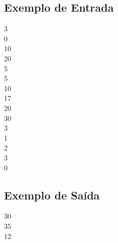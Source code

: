 \subsection{Exemplo de Entrada}
3\\
0\\
10\\
20\\
5\\
5\\
10\\
17\\
20\\
30\\
3\\
1\\
2\\
3\\
0
\subsection{Exemplo de Sa\'ida}
30\\
35\\
12
